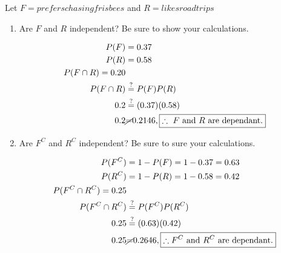     Let $F = { prefers chasing frisbees }$ and $R = { likes road trips }$

    \begin{enumerate}[label=(\alph*)]
        \item Are $F$ and $R$ independent? Be sure to show your calculations.
        
        \begin{mdframed}
            \begin{align*}
                P(F) & = 0.37   \\
                P(R) & = 0.58   \\
                P(F \cap R) = 0.20  \\
                P(F \cap R) & \stackrel{?}{=} P(F)P(R)  \\
                0.2 & \stackrel{?}{=} (0.37)(0.58) \\
                0.2 & \cancel{=} 0.2146, \boxed{\therefore \text{ $F$ and $R$ are dependant.}}
            \end{align*}
        \end{mdframed}

        \pagebreak

        \item Are $F^C$ and $R^C$ independent? Be sure to sure your calculations.
        
        \begin{mdframed}
            \begin{align*}
                P(F^C) & = 1 - P(F) = 1 - 0.37 = 0.63           \\
                P(R^C) & = 1 - P(R) = 1 - 0.58 = 0.42           \\
                P(F^C \cap R^C) = 0.25                          \\
                P(F^C \cap R^C) & \stackrel{?}{=} P(F^C)P(R^C)  \\
                0.25 & \stackrel{?}{=} (0.63)(0.42)             \\
                0.25 & \cancel{=} 0.2646, \boxed{\therefore \text{$F^C$ and $R^C$ are dependant.}}
            \end{align*}
        \end{mdframed}
    \end{enumerate}


